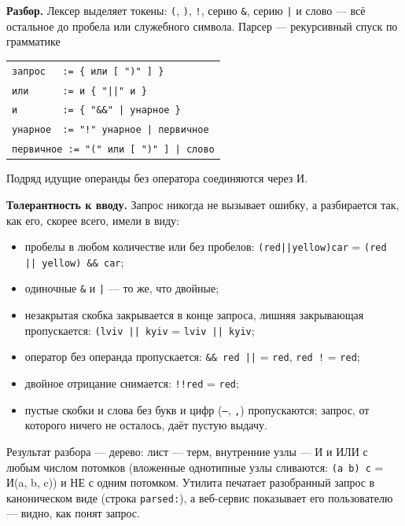 \textbf{Разбор.} Лексер выделяет токены: \texttt{(}, \texttt{)}, \texttt{!}, серию \texttt{\&}, серию \texttt{|} и слово --- всё остальное до пробела или служебного символа. Парсер --- рекурсивный спуск по грамматике
\begin{center}
\small
\begin{tabular}{l}
\texttt{запрос \ \ := \{ или [ ")" ] \}} \\
\texttt{или \ \ \ \ \ := и \{ "||" и \}} \\
\texttt{и \ \ \ \ \ \ \ := \{ "\&\&" | унарное \}} \\
\texttt{унарное \ := "!" унарное | первичное} \\
\texttt{первичное := "(" или [ ")" ] | слово} \\
\end{tabular}
\end{center}
Подряд идущие операнды без оператора соединяются через И.

\textbf{Толерантность к вводу.} Запрос никогда не вызывает ошибку, а разбирается так, как его, скорее всего, имели в виду:
\begin{itemize}
    \item пробелы в любом количестве или без пробелов: \texttt{(red||yellow)car} = \texttt{(red || yellow) \&\& car};
    \item одиночные \texttt{\&} и \texttt{|} --- то же, что двойные;
    \item незакрытая скобка закрывается в конце запроса, лишняя закрывающая пропускается: \texttt{(lviv || kyiv} = \texttt{lviv || kyiv};
    \item оператор без операнда пропускается: \texttt{\&\& red ||} = \texttt{red}, \texttt{red !} = \texttt{red};
    \item двойное отрицание снимается: \texttt{!!red} = \texttt{red};
    \item пустые скобки и слова без букв и цифр (\texttt{---}, \texttt{,}) пропускаются; запрос, от которого ничего не осталось, даёт пустую выдачу.
\end{itemize}

Результат разбора --- дерево: лист --- терм, внутренние узлы --- И и ИЛИ с любым числом потомков (вложенные однотипные узлы сливаются: \texttt{(a b) c} = И(a, b, c)) и НЕ с одним потомком. Утилита печатает разобранный запрос в каноническом виде (строка \texttt{parsed:}), а веб-сервис показывает его пользователю --- видно, как понят запрос.

